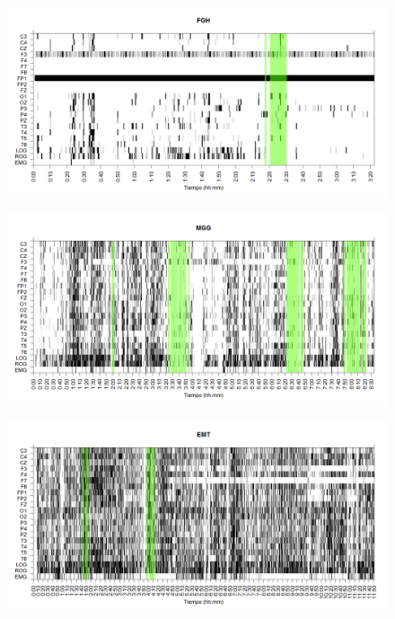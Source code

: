 \documentclass[12pt,a4paper]{mitthesis}
\begin{document}
\begin{figure}
\centering
\includegraphics[width=0.9\linewidth]
{./g170413/FGHSUE_est.png} 
\label{grf_FGH}
\end{figure}

\begin{figure}
\centering
\includegraphics[width=0.9\linewidth]
{./g170413/MGNA5SUE_est.png} 
\label{grf_MGG}
\end{figure}

\begin{figure}
\centering
\includegraphics[width=0.9\linewidth]
{./g170413/EMNNS_est.png} 
\label{grf_EMT}
\end{figure}

\end{document}
